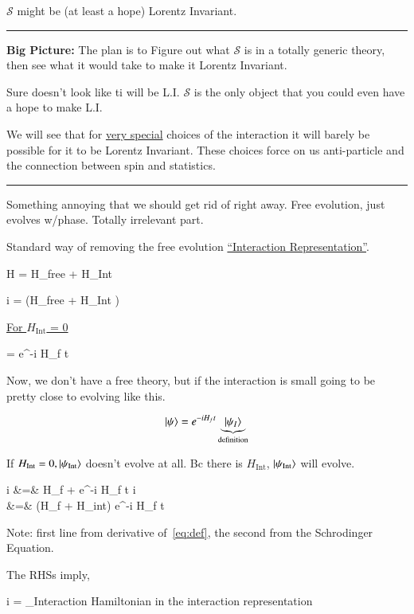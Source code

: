 {$\mathcal{S}$ might be (at least a hope) Lorentz Invariant.


\noindent\rule{\textwidth}{1pt}

\textbf{Big Picture:}
The plan is to Figure out what $\mathcal{S}$ is in a totally generic theory, then see what it would take to make it Lorentz Invariant. 

Sure doesn't look like ti will be L.I. 
$\mathcal{S}$ is the only object that you could even have a hope to make L.I.

We will see that for \underline{very special} choices of the interaction it will barely be possible for it to be Lorentz Invariant. 
These choices force on us anti-particle and the connection between spin and statistics. 

\noindent\rule{\textwidth}{1pt}

Something annoying that we should get rid of right away. 
Free evolution, just evolves w/phase. Totally irrelevant part.


Standard way of removing the free evolution \underline{``Interaction Representation''}.

\be
H = H_\textrm{free} + H_\textrm{Int}
\ee


\be
i  = \left(H_\textrm{free} + H_\textrm{Int} \right) \ket{\psi} 
\ee

\underline{For $H_\textrm{Int}$ = 0}

\be
\ket{\psi} = e^{-i H_f t} 
\ee

Now, we don't have a free theory, but if the interaction is small going to be pretty close to evolving like this. 


\begin{equation}\label{eq:def}
\ket{\psi} = e^{-i H_f t} \underbrace{\ket{\psi_{I}}}_{\textrm{definition}}
\end{equation}

If $H_\textrm{Int} = 0, \ket{\psi_\textrm{Int}}$ doesn't evolve at all.
Bc there is $H_\textrm{Int}$, $\ket{\psi_\textrm{Int}}$ will evolve. 

\bea
i  \ket{\psi} &=& H_\textrm{f} \ket{\psi} + e^{-i H_f t} i   \\
&=& (H_f + H_\textrm{int}) e^{-i H_f t} 
\eea

Note: first line from derivative of~\ref{eq:def}, the second from the Schrodinger Equation.

The RHSs imply, 

\be
i   =  _{\textrm{Interaction Hamiltonian in the interaction representation}}   
\ee


}
